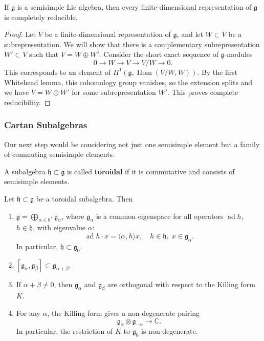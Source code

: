 \documentclass[12pt]{article}
\begin{document}
\begin{theorem}
     If $\mathfrak g$ is a semisimple Lie algebra, then every finite-dimensional representation of $\mathfrak g$ is completely reducible.
\end{theorem}

\begin{proof}
    Let $V$ be a finite-dimensional representation of $\mathfrak g$, and let $W \subset V$ be a subrepresentation. We will show that there is a complementary subrepresentation $W' \subset V$ such that $V = W \oplus W'$. Consider the short exact sequence of $\mathfrak g$-modules
    \[
        0 \to W \to V \to V/W \to 0.
    \]
    This corresponds to an element of $H^1(\mathfrak g, \operatorname{Hom}(V/W,W))$. By the first Whitehead lemma, this cohomology group vanishes, so the extension splits and we have $V = W \oplus W'$ for some subrepresentation $W'$. This proves complete reducibility.
\end{proof}

\subsubsection{Cartan Subalgebras}

Our next step would be considering not just one semisimple element but a family of commuting semisimple elements.

\begin{definition}
    A subalgebra $\mathfrak h \subset \mathfrak g$ is called \textbf{toroidal} if it is commutative and consists of semisimple elements.
\end{definition}

\begin{theorem}
    Let $\mathfrak h \subset \mathfrak g$ be a toroidal subalgebra. Then
    \begin{enumerate}
        \item $\displaystyle \mathfrak g = \bigoplus_{\alpha \in \mathfrak h^*} \mathfrak g_\alpha$, where $\mathfrak g_\alpha$ is a common eigenspace for all operators $\operatorname{ad} h$, $h \in \mathfrak h$, with eigenvalue $\alpha$:
              \[
                  \operatorname{ad} h \cdot x = \langle \alpha, h \rangle x, \quad h \in \mathfrak h,\; x \in \mathfrak g_\alpha.
              \]
              In particular, $\mathfrak h \subset \mathfrak g_0$.

        \item $[\mathfrak g_\alpha, \mathfrak g_\beta] \subset \mathfrak g_{\alpha+\beta}$.

        \item If $\alpha + \beta \neq 0$, then $\mathfrak g_\alpha$ and $\mathfrak g_\beta$ are orthogonal with respect to the Killing form $K$.

        \item For any $\alpha$, the Killing form gives a non-degenerate pairing
              \[
                  \mathfrak g_\alpha \otimes \mathfrak g_{-\alpha} \to \mathbb{C}.
              \]
              In particular, the restriction of $K$ to $\mathfrak g_0$ is non-degenerate.
    \end{enumerate}
\end{theorem}
\end{document}
